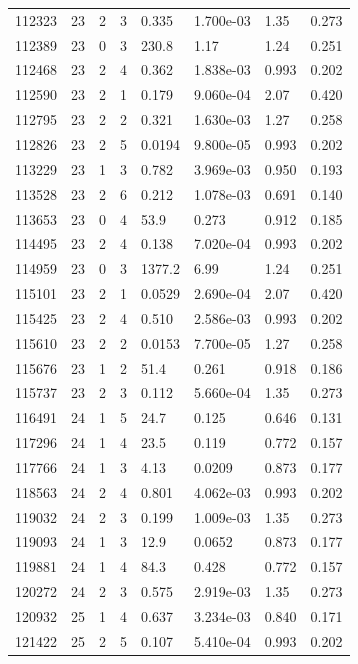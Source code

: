 \documentclass[preview]{standalone}
\begin{document}
{{{{{{\begin{tabular}{L{1.2cm}C{1.2cm} C{0.3cm}C{0.5cm} C{1.4cm}C{1.4cm} C{1.4cm}C{1.4cm}}
  112323  &    23  & 2     &  3 &  0.335  & 1.700e-03  & 1.35 &  0.273   \\ 
  112389  &    23  & 0     &  3 &  230.8  & 1.17  & 1.24 &  0.251   \\ 
  112468  &    23  & 2     &  4 &  0.362  & 1.838e-03  & 0.993 &  0.202   \\ 
  112590  &    23  & 2     &  1 &  0.179  & 9.060e-04  & 2.07 &  0.420   \\ 
  112795  &    23  & 2     &  2 &  0.321  & 1.630e-03  & 1.27 &  0.258   \\ 
  112826  &    23  & 2     &  5 &  0.0194  & 9.800e-05  & 0.993 &  0.202   \\ 
  113229  &    23  & 1     &  3 &  0.782  & 3.969e-03  & 0.950 &  0.193   \\ 
  113528  &    23  & 2     &  6 &  0.212  & 1.078e-03  & 0.691 &  0.140   \\ 
  113653  &    23  & 0     &  4 &  53.9  & 0.273  & 0.912 &  0.185   \\ 
  114495  &    23  & 2     &  4 &  0.138  & 7.020e-04  & 0.993 &  0.202   \\ 
  114959  &    23  & 0     &  3 &  1377.2  & 6.99  & 1.24 &  0.251   \\ 
  115101  &    23  & 2     &  1 &  0.0529  & 2.690e-04  & 2.07 &  0.420   \\ 
  115425  &    23  & 2     &  4 &  0.510  & 2.586e-03  & 0.993 &  0.202   \\ 
  115610  &    23  & 2     &  2 &  0.0153  & 7.700e-05  & 1.27 &  0.258   \\ 
  115676  &    23  & 1     &  2 &  51.4  & 0.261  & 0.918 &  0.186   \\ 
  115737  &    23  & 2     &  3 &  0.112  & 5.660e-04  & 1.35 &  0.273   \\ 
  116491  &    24  & 1     &  5 &  24.7  & 0.125  & 0.646 &  0.131   \\ 
  117296  &    24  & 1     &  4 &  23.5  & 0.119  & 0.772 &  0.157   \\ 
  117766  &    24  & 1     &  3 &  4.13  & 0.0209  & 0.873 &  0.177   \\ 
  118563  &    24  & 2     &  4 &  0.801  & 4.062e-03  & 0.993 &  0.202   \\ 
  119032  &    24  & 2     &  3 &  0.199  & 1.009e-03  & 1.35 &  0.273   \\ 
  119093  &    24  & 1     &  3 &  12.9  & 0.0652  & 0.873 &  0.177   \\ 
  119881  &    24  & 1     &  4 &  84.3  & 0.428  & 0.772 &  0.157   \\ 
  120272  &    24  & 2     &  3 &  0.575  & 2.919e-03  & 1.35 &  0.273   \\ 
  120932  &    25  & 1     &  4 &  0.637  & 3.234e-03  & 0.840 &  0.171   \\ 
  121422  &    25  & 2     &  5 &  0.107  & 5.410e-04  & 0.993 &  0.202   \\ 
\hline 
\end{tabular} 

}}}}}}
\end{document}
